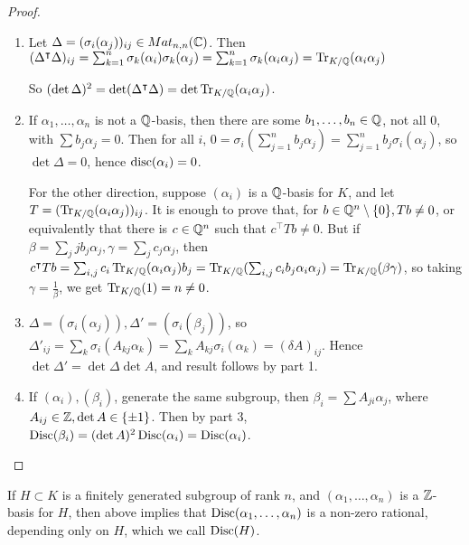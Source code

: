 \documentclass[10pt,a4paper]{article}
\begin{document}
\begin{proof}
\item
\begin{enumerate}
\item Let $\Delta = (\sigma_i(\alpha_j))_{ij} \in Mat_{n,n}(\mathbb{C})$. Then $(\Delta^\intercal\Delta)_{ij} = \sum_{k=1}^n \sigma_k(\alpha_i)\sigma_k(\alpha_j) = \sum_{k=1}^n \sigma_k(\alpha_i\alpha_j) = \operatorname{Tr}_{K/\mathbb{Q}}(\alpha_i\alpha_j)$

So $(\det \Delta)^2 = \det(\Delta^\intercal\Delta) = \det\operatorname{Tr}_{K/\mathbb{Q}}(\alpha_i\alpha_j)$.

\item If $\alpha_1, \ldots, \alpha_n$ is not a $\mathbb{Q}$-basis, then there are some $b_1, \ldots, b_n \in \mathbb{Q}$, not all $0$, with $\sum b_j\alpha_j = 0$. Then for all $i$, $0 = \sigma_i\left(\sum_{j=1}^n b_j\alpha_j\right) = \sum_{j=1}^n b_j\sigma_i(\alpha_j)$, so $\det \Delta = 0$, hence $\operatorname{disc}(\alpha_i) = 0$.

For the other direction, suppose $(\alpha_i)$ is a $\mathbb{Q}$-basis for $K$, and let $T = (\operatorname{Tr}_{K/\mathbb{Q}}(\alpha_i\alpha_j))_{ij}$. It is enough to prove that, for $b \in \mathbb{Q}^n\setminus\{0\}, Tb \neq 0$, or equivalently that there is $c \in \mathbb{Q}^n$ such that $c^\intercal Tb \neq 0$. But if $\beta  = \sum_j jb_j\alpha_j, \gamma = \sum_j c_j\alpha_j$, then $c^\intercal T b = \sum_{i,j} c_i \operatorname{Tr}_{K/\mathbb{Q}}(\alpha_i\alpha_j)b_j = \operatorname{Tr}_{K/\mathbb{Q}}(\sum_{i,j}c_ib_j\alpha_i\alpha_j ) = \operatorname{Tr}_{K/\mathbb{Q}}(\beta\gamma)$, so taking $\gamma = \frac1\beta$, we get $\operatorname{Tr}_{K/\mathbb{Q}}(1) = n \neq 0$.

\item $\Delta = (\sigma_i(\alpha_j)), \Delta' = (\sigma_i(\beta_j))$, so $\Delta'_{ij} = \sum_k \sigma_i(A_{kj}\alpha_k) = \sum_{k} A_{kj}\sigma_i(\alpha_k) = (\delta A)_{ij}$. Hence $\det \Delta' = \det \Delta \det A$, and result follows by part 1.

\item If $(\alpha_i), (\beta_i)$, generate the same subgroup, then $\beta_i = \sum A_{ji}\alpha_j$, where $A_{ij} \in \mathbb{Z}, \det A \in \{\pm 1\}$. Then by part 3, $\operatorname{Disc}(\beta_i) = (\det A)^2 \operatorname{Disc}(\alpha_i) = \operatorname{Disc}(\alpha_i)$.
\end{enumerate}
\end{proof}


If $H \subset K$ is a finitely generated subgroup of rank $n$, and $(\alpha_1, \ldots, \alpha_n)$ is a $\mathbb{Z}$-basis for $H$, then above implies that $\operatorname{Disc}(\alpha_1, \ldots, \alpha_n)$ is a non-zero rational, depending only on $H$, which we call $\operatorname{Disc}(H)$.
\end{document}

